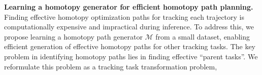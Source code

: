\noindent\textbf{Learning a homotopy generator for efficient homotopy path planning.} 
Finding effective homotopy optimization paths for tracking each trajectory is computationally expensive and impractical during inference. To address this, we propose learning a homotopy path generator $\mathcal{M}$ from a small dataset, enabling efficient generation of effective homotopy paths for other tracking tasks. The key problem in identifying homotopy paths lies in finding  effective ``parent tasks''. We reformulate this problem as a tracking task transformation problem,
